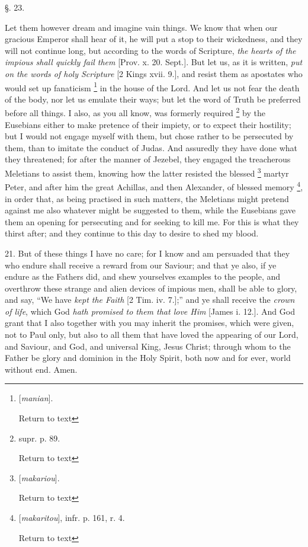 §. 23.

Let them however dream and imagine vain things.
We know that when our gracious Emperor shall hear of it, he will put a
stop to their wickedness, and they will not continue long, but
according to the words of Scripture, \emph{the hearts of the impious
shall quickly fail them} [Prov. x. 20. Sept.]. But let us, as it is
written, \emph{put on the words of holy Scripture} [2 Kings xvii. 9.],
and resist them as apostates who would set up fanaticism \footnote{[\emph{manian}].

Return to text} in the house of the Lord. And let us not fear the death of the
body, nor let us emulate their ways; but let the word of Truth be
preferred before all things. I also, as you all know, was formerly
required \footnote{supr. p. 89.

Return to text} by the Eusebians either to
make pretence of their impiety, or to expect their hostility; but I
would not engage myself with them, but chose rather to be persecuted
by them, than to imitate the conduct of Judas. And assuredly they have
done what they threatened; for after the manner of Jezebel, they
engaged the treacherous Meletians to assist them, knowing how the
latter resisted the blessed \footnote{[\emph{makariou}].

Return to text} martyr
Peter, and after him the great Achillas, and then Alexander, of
blessed memory \footnote{[\emph{makaritou}], infr. p. 161, r. 4.

Return to text}, in order that, as
being practised in such matters, the Meletians might pretend against
me also whatever might be suggested to them, while the Eusebians gave
them an opening for persecuting and for seeking to kill me. For this
is what they thirst after; and they continue to this day to desire to
shed my blood.

21. But of these things I have no care; for I
know and am persuaded that they who endure shall receive a reward from
our Saviour; and that ye also, if ye endure as the Fathers did, and
shew yourselves examples to the people, and overthrow these
strange and alien devices of impious men, shall be able to glory, and
say, ``We have \emph{kept the Faith} [2 Tim. iv. 7.];'' and ye shall
receive the \emph{crown of life}, which God \emph{hath promised to them
that love Him} [James i. 12.]. And God grant that I also together
with you may inherit the promises, which were given, not to Paul only,
but also to all them that have loved the appearing of our Lord, and
Saviour, and God, and universal King, Jesus Christ; through whom to
the Father be glory and dominion in the Holy Spirit, both now and for
ever, world without end. Amen.

